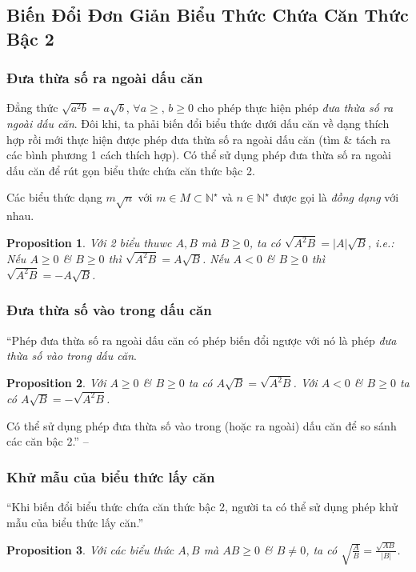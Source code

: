 \documentclass{article}
\numberwithin{equation}{section}
\newtheorem{proposition}{Proposition}[section]
\begin{document}
\subsection{Biến Đổi Đơn Giản Biểu Thức Chứa Căn Thức Bậc 2}

\subsubsection{Đưa thừa số ra ngoài dấu căn}
Đẳng thức $\sqrt{a^2b} = a\sqrt{b}$, $\forall a\ge,\,b\ge 0$ cho phép thực hiện phép \textit{đưa thừa số ra ngoài dấu căn}. Đôi khi, ta phải biến đổi biểu thức dưới dấu căn về dạng thích hợp rồi mới thực hiện được phép đưa thừa số ra ngoài dấu căn (tìm \& tách ra các bình phương 1 cách thích hợp). Có thể sử dụng phép đưa thừa số ra ngoài dấu căn để rút gọn biểu thức chứa căn thức bậc 2.

Các biểu thức dạng $m\sqrt{n}$ với $m\in M\subset\mathbb{N}^\star$ và $n\in\mathbb{N}^\star$ được gọi là \textit{đồng dạng} với nhau.

\begin{proposition}
	Với 2 biểu thuwc $A,B$ mà $B\ge 0$, ta có $\sqrt{A^2B} = |A|\sqrt{B}$, i.e.: Nếu $A\ge 0$ \& $B\ge 0$ thì $\sqrt{A^2B} = A\sqrt{B}$. Nếu $A < 0$ \& $B\ge 0$ thì $\sqrt{A^2B} = -A\sqrt{B}$.
\end{proposition}

\subsubsection{Đưa thừa số vào trong dấu căn}
``Phép đưa thừa số ra ngoài dấu căn có phép biến đổi ngược với nó là phép \textit{đưa thừa số vào trong dấu căn}.

\begin{proposition}
	Với $A\ge 0$ \& $B\ge 0$ ta có $A\sqrt{B} = \sqrt{A^2B}$. Với $A < 0$ \& $B\ge 0$ ta có $A\sqrt{B} = -\sqrt{A^2B}$.
\end{proposition}
Có thể sử dụng phép đưa thừa số vào trong (hoặc ra ngoài) dấu căn để so sánh các căn bậc 2.'' -- \cite[p. 26]{SGK_Toan_9_tap_1}

\subsubsection{Khử mẫu của biểu thức lấy căn}
``Khi biến đổi biểu thức chứa căn thức bậc 2, người ta có thể sử dụng phép khử mẫu của biểu thức lấy căn.''

\begin{proposition}
	Với các biểu thức $A,B$ mà $AB\ge 0$ \& $B\ne 0$, ta có $\sqrt{\frac{A}{B}} = \frac{\sqrt{AB}}{|B|}$.
\end{proposition}
\end{document}
